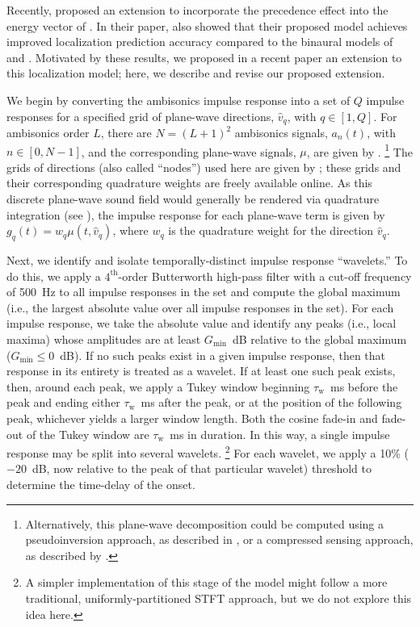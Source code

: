 Recently, \citet{Stitt2016} proposed an extension to incorporate the precedence effect into the energy vector of \citet{Gerzon1992}.
In their paper, \citeauthor{Stitt2016} also showed that their proposed model achieves improved localization prediction accuracy compared to the binaural models of \citet{Dietz2011} and \citet{Lindemann1986a}.
Motivated by these results, we proposed in a recent paper \citep{TylkaChoueiri2016} an extension to this localization model; here, we describe and revise our proposed extension.

We begin by converting the ambisonics impulse response into a set of $Q$ impulse responses for a specified grid of plane-wave directions, $\hat{v}_q$, with $q \in [1,Q]$.
For ambisonics order $L$, there are $N = (L + 1)^2$ ambisonics signals, $a_n(t)$, with $n \in [0, N-1]$, and the corresponding plane-wave signals, $\mu$, are given by .%
\footnote{Alternatively, this plane-wave decomposition could be computed using a pseudoinversion approach, as described in , or a compressed sensing approach, as described by \citet[Eq.~(10)]{Epain2009}.}
The grids of directions (also called ``nodes'') used here are given by \citet{FliegeMaier1999}; these grids and their corresponding quadrature weights are freely available online.
As this discrete plane-wave sound field would generally be rendered via quadrature integration (see ), the impulse response for each plane-wave term is given by $g_q(t) = w_q \mu(t,\hat{v}_q)$, where $w_q$ is the quadrature weight for the direction $\hat{v}_q$.

Next, we identify and isolate temporally-distinct impulse response ``wavelets.''
To do this, we apply a $4^\textrm{th}$-order Butterworth high-pass filter with a cut-off frequency of 500~Hz to all impulse responses in the set and compute the global maximum (i.e., the largest absolute value over all impulse responses in the set).
For each impulse response, we take the absolute value and identify any peaks (i.e., local maxima) whose amplitudes are at least $G_\text{min}$~dB relative to the global maximum ($G_\text{min} \leq 0$~dB).
If no such peaks exist in a given impulse response, then that response in its entirety is treated as a wavelet.
If at least one such peak exists, then, around each peak, we apply a Tukey window beginning $\tau_\text{w}$~ms before the peak and ending either $\tau_\text{w}$~ms after the peak, or at the position of the following peak, whichever yields a larger window length.
Both the cosine fade-in and fade-out of the Tukey window are $\tau_\text{w}$~ms in duration.
In this way, a single impulse response may be split into several wavelets.%
\footnote{A simpler implementation of this stage of the model might follow a more traditional, uniformly-partitioned STFT approach, but we do not explore this idea here.}
For each wavelet, we apply a 10\% ($-20$~dB, now relative to the peak of that particular wavelet) threshold to determine the time-delay of the onset.

